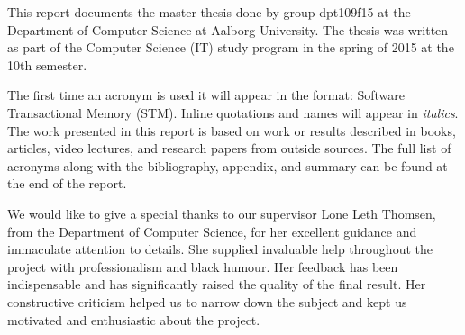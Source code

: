 \makeatletter {}\makeatother
{}
This report documents the master thesis done by group dpt109f15 at the Department of Computer Science at Aalborg University. The thesis was written as part of the Computer Science (IT) study program in the spring of 2015 at the 10th semester.

The first time an acronym is used it will appear in the format: Software Transactional Memory (STM). Inline quotations and names will appear in \textit{italics}. The work presented in this report is based on work or results described in books, articles, video lectures, and research papers from outside sources. The full list of acronyms along with the bibliography, appendix, and summary can be found at the end of the report.

We would like to give a special thanks to our supervisor Lone Leth Thomsen, from the Department of Computer Science, for her excellent guidance and immaculate attention to details. She supplied invaluable help throughout the project with professionalism and black humour. Her feedback has been indispensable and has significantly raised the quality of the final result. Her constructive criticism helped us to narrow down the subject and kept us motivated and enthusiastic about the project.

